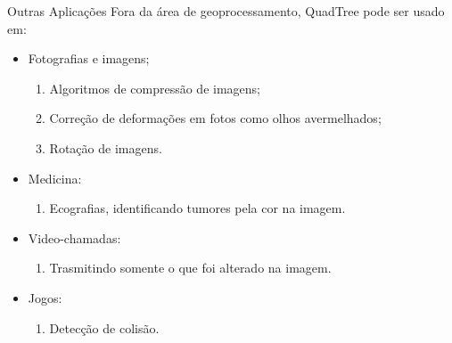 		\begin{frame}{Outras Aplicações}
			Fora da área de geoprocessamento, QuadTree pode ser usado em:
			\begin{itemize}
				\setlength{\itemsep}{1.5em}
				\item Fotografias e imagens;
				\begin{enumerate}
					\item Algoritmos de compressão de imagens;
					\item Correção de deformações em fotos como olhos avermelhados;
					\item Rotação de imagens.
				\end{enumerate}
				
				\item Medicina:
				\begin{enumerate}
					\item Ecografias, identificando tumores pela cor na imagem.
				\end{enumerate}
				
				\item Video-chamadas:
				\begin{enumerate}
					\item Trasmitindo somente o que foi alterado na imagem.
				\end{enumerate}
				
				\item Jogos:
				\begin{enumerate}
					\item Detecção de colisão.
				\end{enumerate}
			\end{itemize}
		\end{frame}